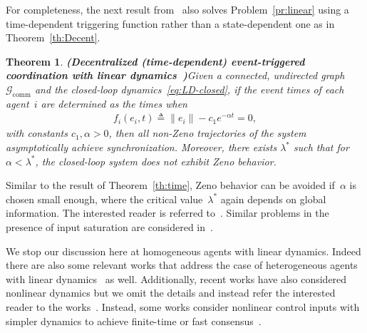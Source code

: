 \documentclass{autart}
\newtheorem{theorem}{Theorem}[section]
\newcommand{\GG}{{\mathcal{G}}}
\newcommand{\commgraph}{\GG_\text{comm}}
\newcommand{\TwoNorm}[1]{\|#1\|}
\renewcommand{\hat}{\widehat}
\newcommand{\longthmtitle}[1]{\mbox{}\textup{\textbf{(#1)}}}
\begin{document}
For completeness, the next result from~\citep{EG-YC-DWC:17b} also
solves Problem~\ref{pr:linear} using a time-dependent triggering
function rather than a state-dependent one as in
Theorem~\ref{th:Decent}.

\begin{theorem}\longthmtitle{Decentralized (time-dependent) event-triggered
    coordination with linear dynamics~\citep{EG-YC-DWC:17b}}\label{th:LD-time}
  Given {a connected, undirected graph~$\commgraph$ and} the
  closed-loop dynamics~\eqref{eq:LD-closed}, if the event times of
  each agent~$i$ are determined as the times when
  \begin{align*}
    f_i(e_i,t) \triangleq \TwoNorm{e_i} - c_1 e^{-\alpha t} = 0,
  \end{align*}
  with constants $c_1, \alpha > 0$, then all non-Zeno trajectories of
  the system asymptotically achieve synchronization. Moreover, there
  exists $\lambda^*$ such that for $\alpha < \lambda^*$, the
  closed-loop system does not exhibit Zeno behavior.
\end{theorem}

Similar to the result of Theorem~\ref{th:time}, Zeno behavior can be
avoided if~$\alpha$ is chosen small enough, where the critical
value~$\lambda^*$ again depends on global information. The interested
reader is referred to~\citep{EG-YC-DWC:17b}. Similar problems in the
presence of input saturation are considered
in~\citep{XL-CD-PL-DY:16,BZ-XL-TH-HL-GC:16}.

We stop our discussion here at homogeneous agents with linear
dynamics. Indeed there are also some relevant works that address the
case of heterogeneous agents with linear
dynamics~\citep{FZ-ZH-YY-JW-LL-JP:17} as well. Additionally, recent
works have also considered nonlinear dynamics but we omit the details
and instead refer the interested reader to the
works~\citep{YX-YD:13,XZ-LL-GF:15,HL-GC-LX:16,HL-GC-TH-WZ-LX:16,AH-JC:17,DL-DVD-MB-KHJ:16}. Instead,
some works consider nonlinear control inputs with simpler dynamics to
achieve finite-time or fast consensus~\citep{MG-DVD:13,XZ-MC-LW:15}.
\end{document}
